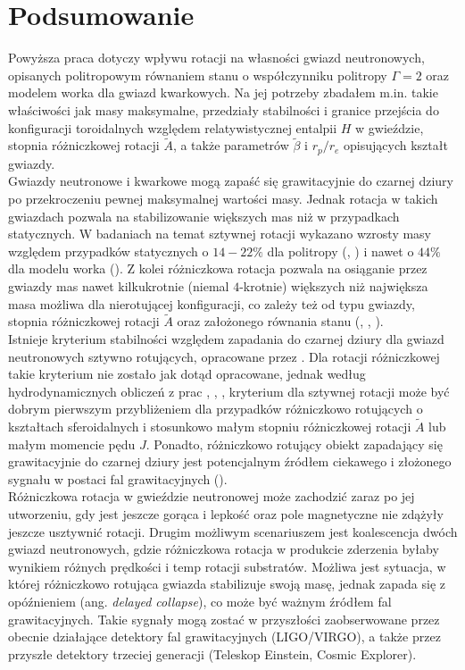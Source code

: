 \documentclass{bachelor_thesis}
\begin{document}
    \chapter{Podsumowanie}
        Powyższa praca dotyczy wpływu rotacji na własności gwiazd neutronowych, opisanych politropowym równaniem stanu o współczynniku politropy $\Gamma=2$ oraz modelem worka dla gwiazd kwarkowych. Na jej potrzeby zbadałem m.in. takie właściwości jak masy maksymalne, przedziały stabilności i granice przejścia do konfiguracji toroidalnych względem relatywistycznej entalpii $H$ w gwieździe, stopnia różniczkowej rotacji $\tilde{A}$, a także parametrów $\tilde{\beta}$ i $r_p/r_e$ opisujących kształt gwiazdy. \\
        \indent Gwiazdy neutronowe i kwarkowe mogą zapaść się grawitacyjnie do czarnej dziury po przekroczeniu pewnej maksymalnej wartości masy. Jednak rotacja w takich gwiazdach pozwala na stabilizowanie większych mas niż w przypadkach statycznych. W badaniach na temat sztywnej rotacji wykazano wzrosty masy względem przypadków statycznych o $14-22\%$ dla politropy (\citealp{Cook1992}, \citealp{Cook1994a}) i nawet o $44\%$ dla modelu worka (\citealp{Rosinska2000}). Z kolei różniczkowa rotacja pozwala na osiąganie przez gwiazdy mas nawet kilkukrotnie (niemal $4$-krotnie) większych niż największa masa możliwa dla nierotującej konfiguracji, co zależy też od typu gwiazdy, stopnia różniczkowej rotacji $\tilde{A}$ oraz założonego równania stanu (\citealp{Studzinska2016}, \citealp{Rosinska2017}, \citealp{Espino2019}).\\
        \indent Istnieje kryterium stabilności względem zapadania do czarnej dziury dla gwiazd neutronowych sztywno rotujących, opracowane przez \cite{Friedman1988}. Dla rotacji różniczkowej takie kryterium nie zostało jak dotąd opracowane, jednak według hydrodynamicznych obliczeń z prac \cite{Giacomazzo2011}, \cite{Bozzola2018}, \cite{Weih2018}, kryterium dla sztywnej rotacji może być dobrym pierwszym przybliżeniem dla przypadków różniczkowo rotujących o kształtach sferoidalnych i stosunkowo małym stopniu różniczkowej rotacji $\tilde{A}$ lub małym momencie pędu $J$. Ponadto, różniczkowo rotujący obiekt zapadający się grawitacyjnie do czarnej dziury jest potencjalnym źródłem ciekawego i złożonego sygnału w postaci fal grawitacyjnych (\citealp{Giacomazzo2011}).\\
        \indent Różniczkowa rotacja w gwieździe neutronowej może zachodzić zaraz po jej utworzeniu, gdy jest jeszcze gorąca i lepkość oraz pole magnetyczne nie zdążyły jeszcze usztywnić rotacji. Drugim możliwym scenariuszem jest koalescencja dwóch gwiazd neutronowych, gdzie różniczkowa rotacja w produkcie zderzenia byłaby wynikiem różnych prędkości i temp rotacji substratów. Możliwa jest sytuacja, w której różniczkowo rotująca gwiazda stabilizuje swoją masę, jednak zapada się z opóźnieniem (ang. \textit{delayed collapse}), co może być ważnym źródłem fal grawitacyjnych. Takie sygnały mogą zostać w przyszłości zaobserwowane przez obecnie działające detektory fal grawitacyjnych (LIGO/VIRGO), a także przez przyszłe detektory trzeciej generacji (Teleskop Einstein, Cosmic Explorer).\\
\end{document}
